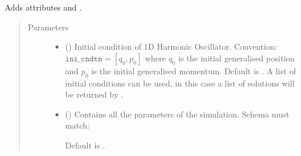 \documentclass[a4paper,landscape,10pt,english]{sphinxmanual}
\begin{document}
\begin{fulllineitems}
\begin{fulllineitems}
Adds attributes
{\hyperref[\detokenize{code_docs/simulation_api.simulation:simulation_api.simulation.simulations.HarmonicOsc1D.m}]{}} and
{\hyperref[\detokenize{code_docs/simulation_api.simulation:simulation_api.simulation.simulations.HarmonicOsc1D.k}]{}}.
\begin{quote}\begin{description}
\item[{Parameters}] \leavevmode\begin{itemize}
\item {} 
 (\sphinxstyleliteralemphasis{\sphinxupquote{, }}\sphinxstyleliteralemphasis{\sphinxupquote{ (}}\sphinxstyleliteralemphasis{\sphinxupquote{,}}\sphinxstyleliteralemphasis{\sphinxupquote{)}}) \textendash{} Initial condition of 1D Harmonic Oscillator. Convention:
\(\texttt{ini_cndtn} = [q_0, p_0]\) where \(q_0\) is the initial
generalised position and \(p_0\) is the initial generalised
momentum. Default is \sphinxcode{\sphinxupquote{{[}0., 1.{]}}}. A list of initial conditions
can be used, in this case a list of solutions will be returned by
{\hyperref[\detokenize{code_docs/simulation_api.simulation:simulation_api.simulation.simulations.Simulation.simulate}]{}}.

\item {} 
 (\sphinxstyleliteralemphasis{\sphinxupquote{, }}) \textendash{} 
Contains all the parameters of the simulation. Schema must match:

\begin{sphinxVerbatim}[commandchars=\\\{\}]
          
          
\end{sphinxVerbatim}

Default is  .



\end{itemize}
\end{description}
\end{quote}
\end{fulllineitems}
\end{fulllineitems}
\end{document}
